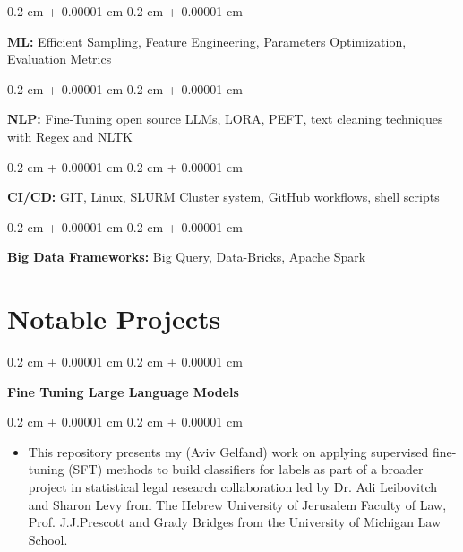 \documentclass[10pt, letterpaper]{article}
\newenvironment{highlights}{
    \begin{itemize}[
        topsep=0.10 cm,
        parsep=0.10 cm,
        partopsep=0pt,
        itemsep=0pt,
        leftmargin=0.4 cm + 10pt
    ]
}{
    \end{itemize}
} %
\newenvironment{onecolentry}{
    \begin{adjustwidth}{
        0.2 cm + 0.00001 cm
    }{
        0.2 cm + 0.00001 cm
    }
}{
    \end{adjustwidth}
} %
\newenvironment{twocolentry}[2][]{
    \onecolentry
    \def\secondColumn{#2}
    \setcolumnwidth{\fill, 4.5 cm}
    \begin{paracol}{2}
}{
    \switchcolumn \raggedleft \secondColumn
    \end{paracol}
    \endonecolentry
} %
\let\hrefWithoutArrow\href
\renewcommand{\href}[2]{\hrefWithoutArrow{#1}{\ifthenelse{\equal{#2}{}}{ }{#2 }\raisebox{.15ex}{\footnotesize \faExternalLink*}}}
\begin{document}
        \vspace{0.2 cm}

        \begin{onecolentry}
            \textbf{ML:} Efficient Sampling, Feature Engineering, Parameters Optimization, Evaluation Metrics
        \end{onecolentry}

        \vspace{0.2 cm}

        \begin{onecolentry}
            \textbf{NLP:} Fine-Tuning open source LLMs, LORA, PEFT, text cleaning techniques with Regex and NLTK
        \end{onecolentry}

        \vspace{0.2 cm}

        \begin{onecolentry}
            \textbf{CI/CD:} GIT, Linux, SLURM Cluster system, GitHub workflows, shell scripts
        \end{onecolentry}

        \vspace{0.2 cm}

        \begin{onecolentry}
            \textbf{Big Data Frameworks:} Big Query, Data-Bricks, Apache Spark
        \end{onecolentry}


    
    \section{Notable Projects}



        
        \begin{twocolentry}{
            
            
        \textit{\href{https://github.com/AvivGelfand/Fine-tuning-Large-Language-Models}{GitHub Repo}}}
            \textbf{Fine Tuning Large Language Models}
        \end{twocolentry}

        \vspace{0.10 cm}
        \begin{onecolentry}
            \begin{highlights}
                \item This repository presents my (Aviv Gelfand) work on applying supervised fine-tuning (SFT) methods to build classifiers for labels as part of a broader project in statistical legal research collaboration led by Dr. Adi Leibovitch and Sharon Levy from The Hebrew University of Jerusalem Faculty of Law, Prof. J.J.Prescott and Grady Bridges from the University of Michigan Law School.
            \end{highlights}
        \end{onecolentry}
\end{document}
